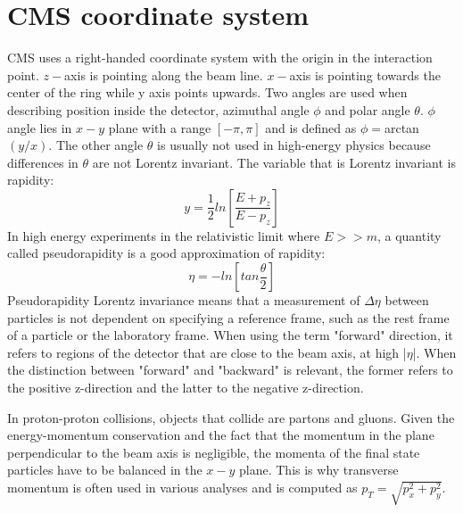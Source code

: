 
\section{CMS coordinate system}

CMS uses a right-handed coordinate system with the origin in the interaction point. $z-$axis is pointing along the beam line. $x-$axis is pointing towards the center of the ring while y axis points upwards. Two angles are used when describing position inside the detector, azimuthal angle $\phi$ and polar angle $\theta$. $\phi$ angle lies in $x-y$ plane with a range $[-\pi,\pi]$  and is defined as $\phi=$arctan$(y/x)$. The other angle $\theta$ is usually not used in high-energy physics because differences in $\theta$ are not Lorentz invariant.
The variable that is Lorentz invariant is rapidity:
\begin{equation}
y=\frac{1}{2}ln\left[ \frac{E+p_z}{E-p_z}\right]
\end{equation}
In high energy experiments in the relativistic limit where $E>>m$, a quantity called pseudorapidity is a good approximation of rapidity:
\begin{equation}
\eta = -ln \left[ tan \frac{\theta}{2} \right]
\end{equation}
Pseudorapidity Lorentz invariance means that a measurement of $\Delta\eta$ between particles is not dependent on specifying a reference frame, such as the rest frame of a particle or the laboratory frame. When using the term "forward" direction, it refers to regions of the detector that are close to the beam axis, at high |$\eta$|. When the distinction between "forward" and "backward" is relevant, the former refers to the positive z-direction and the latter to the negative z-direction.
\par In proton-proton collisions, objects that collide are partons and gluons. Given the energy-momentum conservation and the fact that the momentum in the plane perpendicular to the beam axis is negligible, the momenta of the final state particles have to be balanced in the $x-y$ plane. This is why transverse momentum is often used in various analyses and is computed as $p_T=\sqrt{p_x^2+p_y^2}$.




